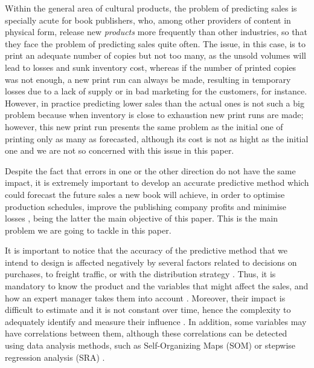 \documentclass[a4paper,10pt,twocolumn,preprint,3p]{elsarticle}
\begin{document}
Within the general area of cultural products, the problem of
predicting sales is specially acute for book publishers, who, among other
providers of content in physical form, release new {\em products} more frequently than
other industries, so that they face the problem of predicting sales quite often. The issue, in this case, is to print an adequate number of copies but not too many, as the unsold volumes will lead to losses and sunk inventory cost, 
whereas if the number of printed copies was not enough, a new print
run can always be made, resulting in temporary losses due to a lack of supply
or in bad marketing for the customers, for instance. However, in
practice predicting lower sales than the actual ones is not such a big
problem because when inventory is close to exhaustion new print runs
are made; however, this new print run presents the same problem as the
initial one of printing only as many as forecasted, although its cost
is not as hight as the initial one and we are not so concerned with
this issue in this paper.

Despite the fact that errors in one or the other direction do not have
the same impact, it is extremely important to develop an accurate
predictive method 
which could forecast the future sales a new book will achieve, in
order to optimise production schedules, improve the publishing company
profits and minimise losses \cite{Zhao2001}, being the latter the main
objective of this paper.  This is the main problem we are going to
tackle in this paper.

It is important to notice that the accuracy of the predictive method
that we intend to design is affected negatively by several factors
related to decisions on purchases, to freight traffic, or with the
distribution strategy \cite{Little1998}. 
Thus, it is mandatory to know the product and the variables that
might affect the sales, and how an expert manager takes them into 
account \cite{Armstrong2001,SThomassey2014}. 
Moreover, their impact is difficult to estimate and it is not constant over time, hence the complexity to adequately identify and measure their influence \cite{DeToni2000}.
In addition, some variables may have correlations between them, although these correlations can be detected using data analysis methods, 
such as Self-Organizing Maps (SOM) \cite{kohonen1998} or stepwise regression analysis (SRA) \cite{Chang2009}. 
\end{document}
